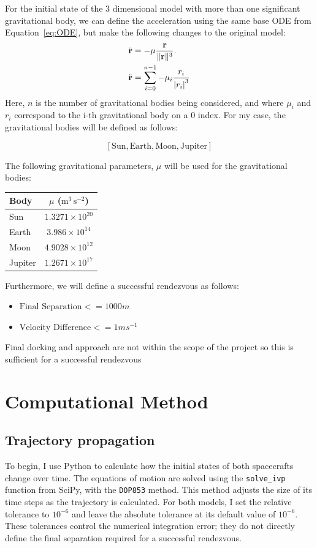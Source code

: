 \documentclass[11pt,letterpaper]{article}
\newcommand{\abs}[1]{\left\lvert#1\right\rvert}
\begin{document}
For the initial state of the 3 dimensional model with more than one significant gravitational body, we can define the acceleration using the same base ODE
from Equation~\ref{eq:ODE}, but make the following changes to the original model:
\begin{align}
  \ddot{\mathbf r}&=-\mu\frac{\mathbf r}{\|\mathbf r\|^3}.\notag\\
    \ddot{\mathbf r}&=\sum_{i=0}^{n-1}-\mu_i\frac{r_i}{\abs{r_i}^3}
    \label{eq:3D_ODE}
\end{align}
Here, $n$ is the number of gravitational bodies being considered, and where $\mu_i$ and $r_i$ correspond to the i-th gravitational body on a 0 index.
For my case, the gravitational bodies will be defined as follows:

\[[\text{Sun}, \text{Earth}, \text{Moon}, \text{Jupiter}]\]

The following gravitational parameters, $\mu$ will be used for the gravitational bodies:
\begin{center}
  \begin{tabular}{lc}
    \toprule
    Body & $\mu$ ($\mathrm{m^3\,s^{-2}}$) \\
    \midrule
    Sun     & $1.3271\times10^{20}$ \\
    Earth   & $3.986\times10^{14}$ \\
    Moon    & $4.9028\times10^{12}$ \\
    Jupiter & $1.2671\times10^{17}$ \\
    \bottomrule
  \end{tabular}
\end{center}

Furthermore, we will define a successful rendezvous as follows:
\begin{itemize}
  \item $\text{Final Separation}<=1000 m$
  \item $\text{Velocity Difference}<=1 ms^{-1}$
\end{itemize}
Final docking and approach are not within the scope of the project so this is sufficient for a successful rendezvous

\section{Computational Method}
\subsection{Trajectory propagation}
To begin, I use Python to calculate how the initial states of both spacecrafts
change over time. The equations of motion are solved using the
\texttt{solve\_ivp} function from SciPy, with the \texttt{DOP853} method.
This method adjusts the size of its time steps as the trajectory is
calculated. For both models, I set the relative tolerance to $10^{-6}$
and leave the absolute tolerance at its default value of $10^{-6}$.
These tolerances control the numerical integration error; they do not
directly define the final separation required for a successful rendezvous.
\end{document}
